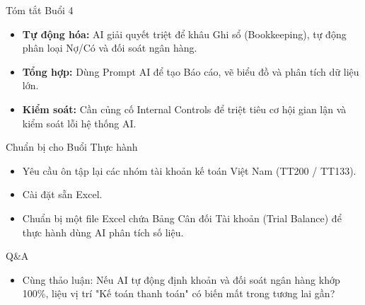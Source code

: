 \documentclass[aspectratio=169]{beamer}
\begin{document}
\begin{frame}{Tóm tắt Buổi 4}
    \begin{itemize}
        \item \textbf{Tự động hóa:} AI giải quyết triệt để khâu Ghi sổ (Bookkeeping), tự động phân loại Nợ/Có và đối soát ngân hàng.
        \item \textbf{Tổng hợp:} Dùng Prompt AI để tạo Báo cáo, vẽ biểu đồ và phân tích dữ liệu lớn.
        \item \textbf{Kiểm soát:} Cần củng cố Internal Controls để triệt tiêu cơ hội gian lận và kiểm soát lỗi hệ thống AI.
    \end{itemize}
\end{frame}


\begin{frame}{Chuẩn bị cho Buổi Thực hành}
    \begin{itemize}
        \item Yêu cầu ôn tập lại các nhóm tài khoản kế toán Việt Nam (TT200 / TT133).
        \item Cài đặt sẵn Excel.
        \item Chuẩn bị một file Excel chứa Bảng Cân đối Tài khoản (Trial Balance) để thực hành dùng AI phân tích số liệu.
    \end{itemize}
\end{frame}


\begin{frame}{Q\&A}
    \begin{itemize}
        \item Cùng thảo luận: Nếu AI tự động định khoản và đối soát ngân hàng khớp 100\%, liệu vị trí "Kế toán thanh toán" có biến mất trong tương lai gần?
    \end{itemize}
\end{frame}
\end{document}

